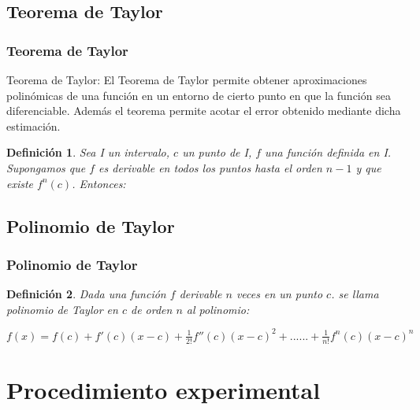 \documentclass{beamer}
\newtheorem{definicion}{Definición}
\begin{document}
\subsection{Teorema de Taylor}
\begin{frame}
\frametitle{Teorema de Taylor}

\begin{block}{Teorema de Taylor:}
El Teorema de Taylor permite obtener aproximaciones polinómicas de una función en un entorno de cierto punto en que la función sea diferenciable. 
Además el teorema permite acotar el error obtenido mediante dicha estimación. 
\end{block}
\begin{definicion}
Sea I un intervalo, $c$ un punto de I, $f$ una función definida en I. Supongamos que $f$ es derivable en todos los puntos hasta el orden
$n-1$ y que existe $f ^ n (c)$. Entonces:



\end{definicion}

\end{frame}


\subsection{Polinomio de Taylor}

\begin{frame}
\frametitle{Polinomio de Taylor}
\begin{definicion}
Dada una función $f$ derivable $n$ veces en un punto $c$. se llama polinomio de Taylor en $c$ de orden $n$ al
polinomio:
\end{definicion}
\begin{block}{ }
	    $f(x) = f(c) + f '(c) (x-c) + \frac{1}{2!} f '' (c) (x-c) ^ 2 + ...... + \frac{1}{n!} f ^ n(c) (x-c) ^ n$
\end{block}
\end{frame}

\section{Procedimiento experimental}
\end{document}
